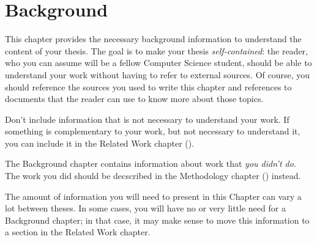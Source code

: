 \chapter{Background}
\label{sec:background}

This chapter provides the necessary background information to understand the content of your thesis.
The goal is to make your thesis \emph{self-contained}: the reader, who you can assume will be
a fellow Computer Science student, should be able to understand your work without having to refer
to external sources. Of course, you should reference the sources you used to write this chapter
and references to documents that the reader can use to know more about those topics.

Don't include information that is not necessary to understand your work. If something is
complementary to your work, but not necessary to understand it, you can include it in the
Related Work chapter ().

The Background chapter contains information about work that \emph{you didn't do}. The work you
did should be decscribed in the Methodology chapter () instead.

The amount of information you will need to present in this Chapter can vary a lot between theses.
In some cases, you will have no or very little need for a Background chapter; in that case, it
may make sense to move this information to a section in the Related Work chapter.
